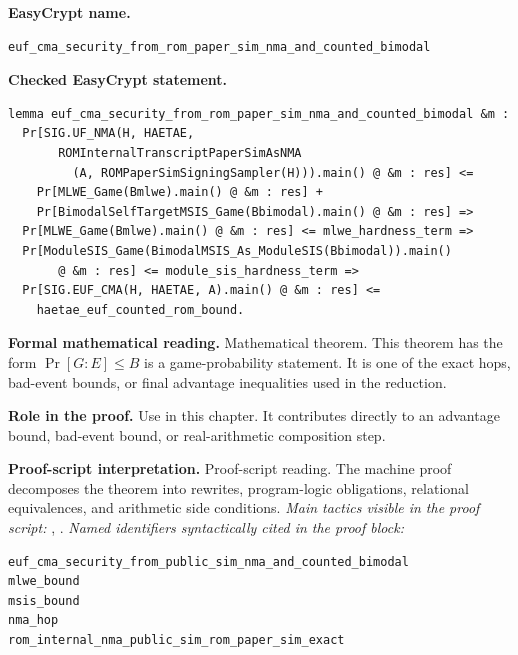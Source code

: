 \begin{formaltheorem}
\noindent\textbf{EasyCrypt name.}
\begin{lstlisting}[language=EasyCrypt,basicstyle=\ttfamily\scriptsize]
euf_cma_security_from_rom_paper_sim_nma_and_counted_bimodal
\end{lstlisting}
\noindent\textbf{Checked EasyCrypt statement.}
\begin{lstlisting}[language=EasyCrypt,basicstyle=\ttfamily\scriptsize]
lemma euf_cma_security_from_rom_paper_sim_nma_and_counted_bimodal &m :
  Pr[SIG.UF_NMA(H, HAETAE,
       ROMInternalTranscriptPaperSimAsNMA
         (A, ROMPaperSimSigningSampler(H))).main() @ &m : res] <=
    Pr[MLWE_Game(Bmlwe).main() @ &m : res] +
    Pr[BimodalSelfTargetMSIS_Game(Bbimodal).main() @ &m : res] =>
  Pr[MLWE_Game(Bmlwe).main() @ &m : res] <= mlwe_hardness_term =>
  Pr[ModuleSIS_Game(BimodalMSIS_As_ModuleSIS(Bbimodal)).main()
       @ &m : res] <= module_sis_hardness_term =>
  Pr[SIG.EUF_CMA(H, HAETAE, A).main() @ &m : res] <=
    haetae_euf_counted_rom_bound.
\end{lstlisting}
\noindent\textbf{Formal mathematical reading.}
Mathematical theorem. This theorem has the form \(\Pr[G:E] \le B\) is a game-probability statement.  It is one of the exact hops, bad-event bounds, or final advantage inequalities used in the reduction.

\noindent\textbf{Role in the proof.}
Use in this chapter. It contributes directly to an advantage bound, bad-event bound, or real-arithmetic composition step.

\noindent\textbf{Proof-script interpretation.}
Proof-script reading. The machine proof decomposes the theorem into rewrites, program-logic obligations, relational equivalences, and arithmetic side conditions.
\emph{Main tactics visible in the proof script:} , .
\emph{Named identifiers syntactically cited in the proof block:}
\begin{lstlisting}[language=EasyCrypt,basicstyle=\ttfamily\scriptsize]
euf_cma_security_from_public_sim_nma_and_counted_bimodal
mlwe_bound
msis_bound
nma_hop
rom_internal_nma_public_sim_rom_paper_sim_exact
\end{lstlisting}

\end{formaltheorem}

